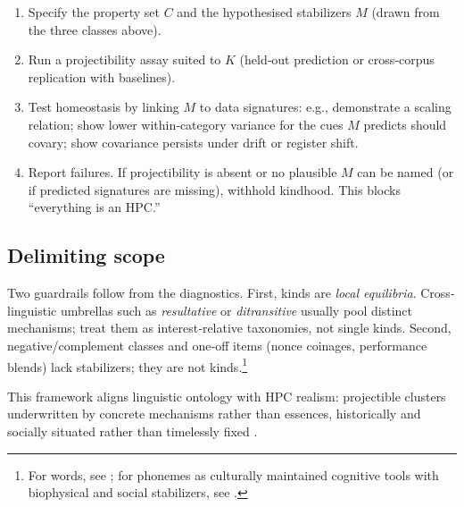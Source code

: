 \documentclass[12pt]{article}
\begin{document}
\begin{enumerate}
\item Specify the property set $C$ and the hypothesised stabilizers $M$ (drawn from the three classes above).
\item Run a projectibility assay suited to $K$ (held‐out prediction or cross‐corpus replication with baselines).
\item Test homeostasis by linking $M$ to data signatures: e.g., demonstrate a scaling relation; show lower within‐category variance for the cues $M$ predicts should covary; show covariance persists under drift or register shift.
\item Report failures. If projectibility is absent or no plausible $M$ can be named (or if predicted signatures are missing), withhold kindhood. This blocks “everything is an HPC.”
\end{enumerate}

\subsection{Delimiting scope}

Two guardrails follow from the diagnostics. First, kinds are \emph{local equilibria}. Cross‐linguistic umbrellas such as \textit{resultative} or \textit{ditransitive} usually pool distinct mechanisms; treat them as interest‐relative taxonomies, not single kinds. Second, negative/complement classes and one‐off items (nonce coinages, performance blends) lack stabilizers; they are not kinds.\footnote{For words, see \citet{Miller2021WordsSpeciesKinds}; for phonemes as culturally maintained cognitive tools with biophysical and social stabilizers, see \citet{Ekstrom2025PhonemeTool}.}

This framework aligns linguistic ontology with HPC realism: projectible clusters underwritten by concrete mechanisms rather than essences, historically and socially situated rather than timelessly fixed \citep{Boyd1991Enthusiasm,Boyd1999Homeostasis,Boyd2000Workmanship}.


\clearpage


\end{document}
